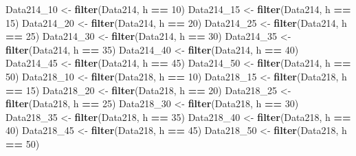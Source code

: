 \documentclass[]{article}
\newenvironment{Shaded}{\begin{snugshade}}{\end{snugshade}}
\newcommand{\DecValTok}[1]{\textcolor[rgb]{0.00,0.00,0.81}{#1}}
\newcommand{\KeywordTok}[1]{\textcolor[rgb]{0.13,0.29,0.53}{\textbf{#1}}}
\newcommand{\NormalTok}[1]{#1}
\newcommand{\OperatorTok}[1]{\textcolor[rgb]{0.81,0.36,0.00}{\textbf{#1}}}
\newcommand{\StringTok}[1]{\textcolor[rgb]{0.31,0.60,0.02}{#1}}
\begin{document}
\begin{Shaded}
\begin{Highlighting}[]
\NormalTok{Data214_}\DecValTok{10}\NormalTok{ <-}\StringTok{ }\KeywordTok{filter}\NormalTok{(Data214, h }\OperatorTok{==}\StringTok{ }\DecValTok{10}\NormalTok{)}
\NormalTok{Data214_}\DecValTok{15}\NormalTok{ <-}\StringTok{ }\KeywordTok{filter}\NormalTok{(Data214, h }\OperatorTok{==}\StringTok{ }\DecValTok{15}\NormalTok{)}
\NormalTok{Data214_}\DecValTok{20}\NormalTok{ <-}\StringTok{ }\KeywordTok{filter}\NormalTok{(Data214, h }\OperatorTok{==}\StringTok{ }\DecValTok{20}\NormalTok{)}
\NormalTok{Data214_}\DecValTok{25}\NormalTok{ <-}\StringTok{ }\KeywordTok{filter}\NormalTok{(Data214, h }\OperatorTok{==}\StringTok{ }\DecValTok{25}\NormalTok{)}
\NormalTok{Data214_}\DecValTok{30}\NormalTok{ <-}\StringTok{ }\KeywordTok{filter}\NormalTok{(Data214, h }\OperatorTok{==}\StringTok{ }\DecValTok{30}\NormalTok{)}
\NormalTok{Data214_}\DecValTok{35}\NormalTok{ <-}\StringTok{ }\KeywordTok{filter}\NormalTok{(Data214, h }\OperatorTok{==}\StringTok{ }\DecValTok{35}\NormalTok{)}
\NormalTok{Data214_}\DecValTok{40}\NormalTok{ <-}\StringTok{ }\KeywordTok{filter}\NormalTok{(Data214, h }\OperatorTok{==}\StringTok{ }\DecValTok{40}\NormalTok{)}
\NormalTok{Data214_}\DecValTok{45}\NormalTok{ <-}\StringTok{ }\KeywordTok{filter}\NormalTok{(Data214, h }\OperatorTok{==}\StringTok{ }\DecValTok{45}\NormalTok{)}
\NormalTok{Data214_}\DecValTok{50}\NormalTok{ <-}\StringTok{ }\KeywordTok{filter}\NormalTok{(Data214, h }\OperatorTok{==}\StringTok{ }\DecValTok{50}\NormalTok{)}
\NormalTok{Data218_}\DecValTok{10}\NormalTok{ <-}\StringTok{ }\KeywordTok{filter}\NormalTok{(Data218, h }\OperatorTok{==}\StringTok{ }\DecValTok{10}\NormalTok{)}
\NormalTok{Data218_}\DecValTok{15}\NormalTok{ <-}\StringTok{ }\KeywordTok{filter}\NormalTok{(Data218, h }\OperatorTok{==}\StringTok{ }\DecValTok{15}\NormalTok{)}
\NormalTok{Data218_}\DecValTok{20}\NormalTok{ <-}\StringTok{ }\KeywordTok{filter}\NormalTok{(Data218, h }\OperatorTok{==}\StringTok{ }\DecValTok{20}\NormalTok{)}
\NormalTok{Data218_}\DecValTok{25}\NormalTok{ <-}\StringTok{ }\KeywordTok{filter}\NormalTok{(Data218, h }\OperatorTok{==}\StringTok{ }\DecValTok{25}\NormalTok{)}
\NormalTok{Data218_}\DecValTok{30}\NormalTok{ <-}\StringTok{ }\KeywordTok{filter}\NormalTok{(Data218, h }\OperatorTok{==}\StringTok{ }\DecValTok{30}\NormalTok{)}
\NormalTok{Data218_}\DecValTok{35}\NormalTok{ <-}\StringTok{ }\KeywordTok{filter}\NormalTok{(Data218, h }\OperatorTok{==}\StringTok{ }\DecValTok{35}\NormalTok{)}
\NormalTok{Data218_}\DecValTok{40}\NormalTok{ <-}\StringTok{ }\KeywordTok{filter}\NormalTok{(Data218, h }\OperatorTok{==}\StringTok{ }\DecValTok{40}\NormalTok{)}
\NormalTok{Data218_}\DecValTok{45}\NormalTok{ <-}\StringTok{ }\KeywordTok{filter}\NormalTok{(Data218, h }\OperatorTok{==}\StringTok{ }\DecValTok{45}\NormalTok{)}
\NormalTok{Data218_}\DecValTok{50}\NormalTok{ <-}\StringTok{ }\KeywordTok{filter}\NormalTok{(Data218, h }\OperatorTok{==}\StringTok{ }\DecValTok{50}\NormalTok{)}
\end{Highlighting}
\end{Shaded}
\end{document}
